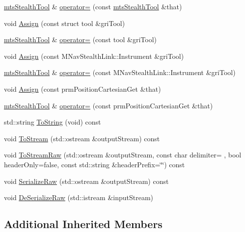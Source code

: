 \begin{DoxyCompactItemize}
\item 
\hyperlink{classmts_stealth_tool}{mts\+Stealth\+Tool} \& \hyperlink{classmts_stealth_tool_a8e34fac36f9e6eb356116e06d9ab61c2}{operator=} (const \hyperlink{classmts_stealth_tool}{mts\+Stealth\+Tool} \&that)
\item 
void \hyperlink{classmts_stealth_tool_aefb688f5db9e6cb54d8af92196928b81}{Assign} (const struct tool \&gri\+Tool)
\item 
\hyperlink{classmts_stealth_tool}{mts\+Stealth\+Tool} \& \hyperlink{classmts_stealth_tool_aa727d88e875cc02aeeebfb7fcc47afdd}{operator=} (const tool \&gri\+Tool)
\item 
void \hyperlink{classmts_stealth_tool_aca8cf9986410e2b155c77b4a58faee83}{Assign} (const M\+Nav\+Stealth\+Link\+::\+Instrument \&gri\+Tool)
\item 
\hyperlink{classmts_stealth_tool}{mts\+Stealth\+Tool} \& \hyperlink{classmts_stealth_tool_a8a9407407b9126f0195af0a4abe945c5}{operator=} (const M\+Nav\+Stealth\+Link\+::\+Instrument \&gri\+Tool)
\item 
void \hyperlink{classmts_stealth_tool_a371596656a661001c3691ae510dab17b}{Assign} (const prm\+Position\+Cartesian\+Get \&that)
\item 
\hyperlink{classmts_stealth_tool}{mts\+Stealth\+Tool} \& \hyperlink{classmts_stealth_tool_afd3d34f5974e9e9d182c0cf7b58b1c5e}{operator=} (const prm\+Position\+Cartesian\+Get \&that)
\item 
std\+::string \hyperlink{classmts_stealth_tool_a18a31c80172f4f6280673c1db6ca8c5b}{To\+String} (void) const 
\item 
void \hyperlink{classmts_stealth_tool_a7550641c7e9eb89a5d1a77f4d48c47e9}{To\+Stream} (std\+::ostream \&output\+Stream) const 
\item 
void \hyperlink{classmts_stealth_tool_a6bfabcb3bee465c02dc9c42578dfd220}{To\+Stream\+Raw} (std\+::ostream \&output\+Stream, const char delimiter= \textquotesingle{} \textquotesingle{}, bool header\+Only=false, const std\+::string \&header\+Prefix=\char`\"{}\char`\"{}) const 
\item 
void \hyperlink{classmts_stealth_tool_a1fa41dcc1d7260a3ddd7f2d5ea7732c9}{Serialize\+Raw} (std\+::ostream \&output\+Stream) const 
\item 
void \hyperlink{classmts_stealth_tool_ad346445c8f547aac0f99e869a585d90a}{De\+Serialize\+Raw} (std\+::istream \&input\+Stream)
\end{DoxyCompactItemize}
\subsection*{Additional Inherited Members}


